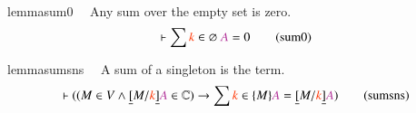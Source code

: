 \begin{restatable}{lemma}{sum0}~~ Any sum over the empty set is zero. 
~  ~
\begin{align}
\vdash \sum \msc{k} \in \varnothing~ \mc{A} = 0\label{eq:sum0}\tag{sum0}
\end{align}
\end{restatable}

\begin{restatable}{lemma}{sumsns}~~ A sum of a singleton is the term. 
~
\begin{align}
\vdash ( ( M \in V \wedge \underline{[} M / \msc{k} \underline{]} \mc{A} \in
    \mathbb{C} ) \rightarrow \sum \msc{k} \in \{ M \} \mc{A} = \underline{[} M
    / \msc{k} \underline{]} \mc{A} )\label{eq:sumsns}\tag{sumsns}
\end{align}
\end{restatable}

